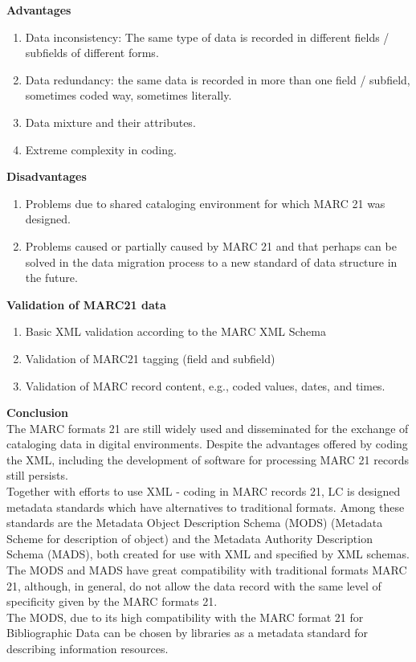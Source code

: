 \begin{enumerate}
	{\bf Advantages}
	\begin{enumerate}
		\item Data inconsistency: The same type of data is recorded in different fields / subfields of different forms.
		\item Data redundancy: the same data is recorded in more than one field / subfield, sometimes coded way, sometimes literally.	
		\item Data mixture and their attributes.
		\item Extreme complexity in coding.
	\end{enumerate}	
	{\bf Disadvantages}
	\begin{enumerate}
		\item Problems due to shared cataloging environment for which MARC 21 was designed.
		\item Problems caused or partially caused by MARC 21 and that perhaps can be solved in the data migration process to a new standard of data structure in the future.
	\end{enumerate}
	
	{\bf Validation of MARC21 data}
	\begin{enumerate}
		\item Basic XML validation according to the MARC XML Schema
		\item Validation of MARC21 tagging (field and subfield)
		\item Validation of MARC record content, e.g., coded values, dates, and times.
	\end{enumerate}
	
	{\bf Conclusion}\\
	The MARC formats 21 are still widely used and disseminated for the exchange of cataloging data in digital environments. Despite the advantages offered by coding the XML, including the development of software for processing MARC 21 records still persists.\\
	Together with efforts to use XML - coding in MARC records 21, LC is designed metadata standards which have alternatives to traditional formats. Among these standards are the Metadata Object Description Schema (MODS) (Metadata Scheme for description of object) and the Metadata Authority Description Schema (MADS), both created for use with XML and specified by XML schemas.\\
	The MODS and MADS have great compatibility with traditional formats MARC 21, although, in general, do not allow the data record with the same level of specificity given by the MARC formats 21.\\
	The MODS, due to its high compatibility with the MARC format 21 for Bibliographic Data can be chosen by libraries as a metadata standard for describing information resources.


\end{enumerate}
